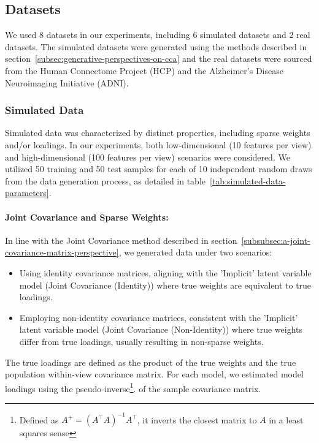 \subsection{Datasets}\label{subsec:datasets}

We used 8 datasets in our experiments, including 6 simulated datasets and 2 real datasets.
The simulated datasets were generated using the methods described in section~\ref{subsec:generative-perspectives-on-cca} and the real datasets were sourced from the Human Connectome Project (HCP) and the Alzheimer's Disease Neuroimaging Initiative (ADNI).

\subsubsection{Simulated Data}

Simulated data was characterized by distinct properties, including sparse weights and/or loadings.
In our experiments, both low-dimensional (10 features per view) and high-dimensional (100 features per view) scenarios were considered.
We utilized 50 training and 50 test samples for each of 10 independent random draws from the data generation process, as detailed in table~\ref{tab:simulated-data-parameters}.

\paragraph{Joint Covariance and Sparse Weights:}
In line with the Joint Covariance method described in section~\ref{subsubsec:a-joint-covariance-matrix-perspective}, we generated data under two scenarios:
\begin{itemize}
    \item Using identity covariance matrices, aligning with the 'Implicit' latent variable model (Joint Covariance (Identity)) where true weights are equivalent to true loadings.
    \item Employing non-identity covariance matrices, consistent with the 'Implicit' latent variable model (Joint Covariance (Non-Identity)) where true weights differ from true loadings, usually resulting in non-sparse weights.
\end{itemize}
The true loadings are defined as the product of the true weights and the true population within-view covariance matrix.
For each model, we estimated model loadings using the pseudo-inverse\footnote{Defined as $A^+ = (A^\top A)^{-1} A^\top$, it inverts the closest matrix to $A$ in a least squares sense}. of the sample covariance matrix.

